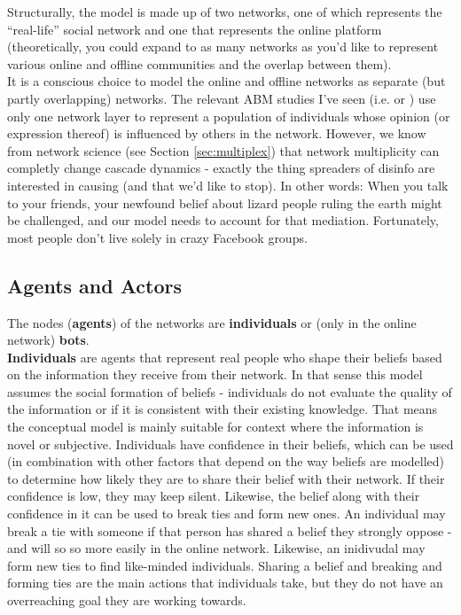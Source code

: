 \documentclass[10pt,a4paper]{article}
\begin{document}
Structurally, the model is made up of two networks, one of which represents the ``real-life'' social network and one that represents the online platform (theoretically, you could expand to as many networks as you'd like to represent various online and offline communities and the overlap between them).\\

It is a conscious choice to model the online and offline networks as separate (but partly overlapping) networks. The relevant ABM studies I've seen (i.e. \cite{Ross2019} or \cite{Deffuant2002}) use only one network layer to represent a population of individuals whose opinion (or expression thereof) is influenced by others in the network. However, we know from network science (see Section \ref{sec:multiplex}) that network multiplicity can completly change cascade dynamics - exactly the thing spreaders of disinfo are interested in causing (and that we'd like to stop). In other words: When you talk to your friends, your newfound belief about lizard people ruling the earth might be challenged, and our model needs to account for that mediation. Fortunately, most people don't live solely in crazy Facebook groups. \\ 

\subsection{Agents and Actors}
The nodes (\textbf{agents}) of the networks are \textbf{individuals} or (only in the online network) \textbf{bots}.  \\

\textbf{Individuals} are agents that represent real people who shape their beliefs based on the information they receive from their network. In that sense this model assumes the social formation of beliefs - individuals do not evaluate the quality of the information or if it is consistent with their existing knowledge. That means the conceptual model is mainly suitable for context where the information is novel or subjective. 
Individuals have confidence in their beliefs, which can be used (in combination with other factors that depend on the way beliefs are modelled) to determine how likely they are to share their belief with their network. If their confidence is low, they may keep silent. Likewise, the belief along with their confidence in it can be used to break ties and form new ones. An individual may break a tie with someone if that person has shared a belief they strongly oppose - and will so so more easily in the online network. Likewise, an inidivudal may form new ties to find like-minded individuals. Sharing a belief and breaking and forming ties are the main actions that individuals take, but they do not have an overreaching goal they are working towards. \\
\end{document}
